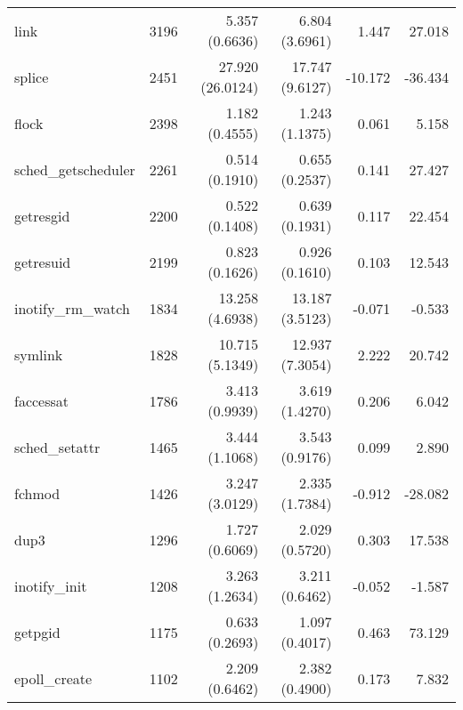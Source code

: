 \begin{longtable}{>{\ttfamily}lrrrrr}
                           link &        3196 &           5.357 (0.6636) &           6.804 (3.6961) &           1.447 &       27.018 \\
                         splice &        2451 &         27.920 (26.0124) &          17.747 (9.6127) &         -10.172 &      -36.434 \\
                          flock &        2398 &           1.182 (0.4555) &           1.243 (1.1375) &           0.061 &        5.158 \\
            sched\_getscheduler &        2261 &           0.514 (0.1910) &           0.655 (0.2537) &           0.141 &       27.427 \\
                      getresgid &        2200 &           0.522 (0.1408) &           0.639 (0.1931) &           0.117 &       22.454 \\
                      getresuid &        2199 &           0.823 (0.1626) &           0.926 (0.1610) &           0.103 &       12.543 \\
             inotify\_rm\_watch &        1834 &          13.258 (4.6938) &          13.187 (3.5123) &          -0.071 &       -0.533 \\
                        symlink &        1828 &          10.715 (5.1349) &          12.937 (7.3054) &           2.222 &       20.742 \\
                      faccessat &        1786 &           3.413 (0.9939) &           3.619 (1.4270) &           0.206 &        6.042 \\
                 sched\_setattr &        1465 &           3.444 (1.1068) &           3.543 (0.9176) &           0.099 &        2.890 \\
                         fchmod &        1426 &           3.247 (3.0129) &           2.335 (1.7384) &          -0.912 &      -28.082 \\
                           dup3 &        1296 &           1.727 (0.6069) &           2.029 (0.5720) &           0.303 &       17.538 \\
                  inotify\_init &        1208 &           3.263 (1.2634) &           3.211 (0.6462) &          -0.052 &       -1.587 \\
                        getpgid &        1175 &           0.633 (0.2693) &           1.097 (0.4017) &           0.463 &       73.129 \\
                  epoll\_create &        1102 &           2.209 (0.6462) &           2.382 (0.4900) &           0.173 &        7.832 \\

\end{longtable}

